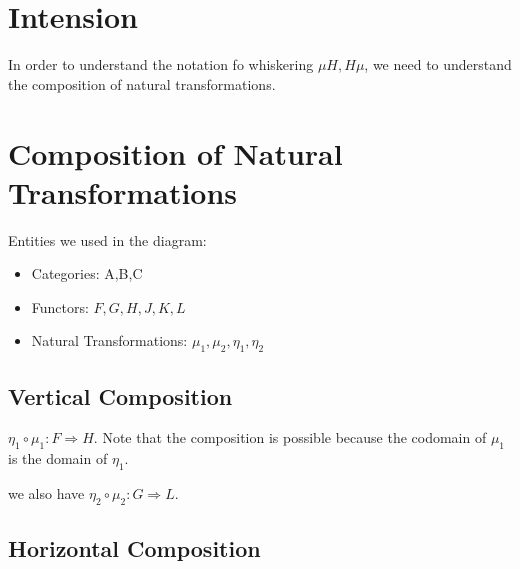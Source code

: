 \documentclass{paper}
\newcommand{\drawEdge}[5]{
  \draw[->] (#1) to[#5] node[midway, above] (#3Above) {$#4$} (#2);
  \draw[->] (#1) to[#5] node[midway, below] (#3Below) {} (#2);
}
\begin{document}
\section*{Intension}
In order to understand the notation fo whiskering $\mu H, H\mu$, we need to understand the composition of natural transformations.

\section*{Composition of Natural Transformations}

Entities we used in the diagram:

\begin{itemize}
  \item Categories: A,B,C
  \item Functors: $F,G,H,J,K,L$
  \item Natural Transformations: $\mu_1, \mu_2, \eta_1, \eta_2$
\end{itemize}



\subsection*{Vertical Composition}
$\eta_1 \circ \mu_1 : F \Rightarrow H$.
Note that the composition is possible because the codomain of $\mu_1$ is the domain of $\eta_1$.

we also have $\eta_2 \circ \mu_2 : G \Rightarrow L$.

\subsection*{Horizontal Composition}
\end{document}
